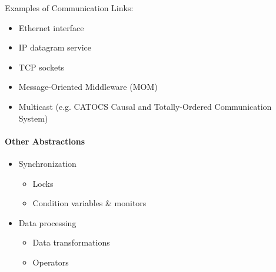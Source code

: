 Examples of Communication Links:
\begin{itemize}
\item Ethernet interface
\item IP datagram service
\item TCP sockets
\item Message-Oriented Middleware (MOM)
\item Multicast (e.g. CATOCS Causal and Totally-Ordered
  Communication System)
\end{itemize}

\paragraph{Other Abstractions}
\begin{itemize}
\item Synchronization
  \begin{itemize}
  \item Locks
  \item Condition variables \& monitors
  \end{itemize}
\item Data processing
  \begin{itemize}
  \item Data transformations
  \item Operators
  \end{itemize}
\end{itemize}

